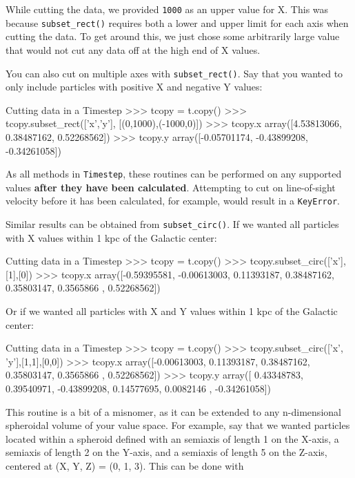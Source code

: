 \documentclass{article}
\begin{document}
While cutting the data, we provided \verb!1000! as an upper value for X. This was because \verb!subset_rect()! requires both a lower and upper limit for each axis when cutting the data. To get around this, we just chose some arbitrarily large value that would not cut any data off at the high end of X values. 

You can also cut on multiple axes with \verb!subset_rect()!. Say that you wanted to only include particles with positive X and negative Y values: \\

\begin{codelisting}{Cutting data in a Timestep}
>>> tcopy = t.copy()
>>> tcopy.subset_rect(['x','y'], [(0,1000),(-1000,0)])
>>> tcopy.x
array([4.53813066, 0.38487162, 0.52268562])
>>> tcopy.y
array([-0.05701174, -0.43899208, -0.34261058])
\end{codelisting}

As all methods in \verb!Timestep!, these routines can be performed on any supported values \textbf{after they have been calculated}. Attempting to cut on line-of-sight velocity before it has been calculated, for example, would result in a \verb!KeyError!. 

Similar results can be obtained from \verb!subset_circ()!. If we wanted all particles with X values within 1 kpc of the Galactic center: \\

\begin{codelisting}{Cutting data in a Timestep}
>>> tcopy = t.copy()
>>> tcopy.subset_circ(['x'],[1],[0])
>>> tcopy.x
array([-0.59395581, -0.00613003,  0.11393187,  0.38487162,  0.35803147,
        0.3565866 ,  0.52268562])
\end{codelisting}

Or if we wanted all particles with X and Y values within 1 kpc of the Galactic center: \\

\begin{codelisting}{Cutting data in a Timestep}
>>> tcopy = t.copy()
>>> tcopy.subset_circ(['x', 'y'],[1,1],[0,0])
>>> tcopy.x
array([-0.00613003,  0.11393187,  0.38487162,  0.35803147,  0.3565866 ,
        0.52268562])
>>> tcopy.y
array([ 0.43348783,  0.39540971, -0.43899208,  0.14577695,  0.0082146 ,
       -0.34261058])
\end{codelisting}

This routine is a bit of a misnomer, as it can be extended to any n-dimensional spheroidal volume of your value space. For example, say that we wanted particles located within a spheroid defined with an semiaxis of length 1 on the X-axis, a semiaxis of length 2 on the Y-axis, and a semiaxis of length 5 on the Z-axis, centered at (X, Y, Z) = (0, 1, 3). This can be done with \\
\end{document}
